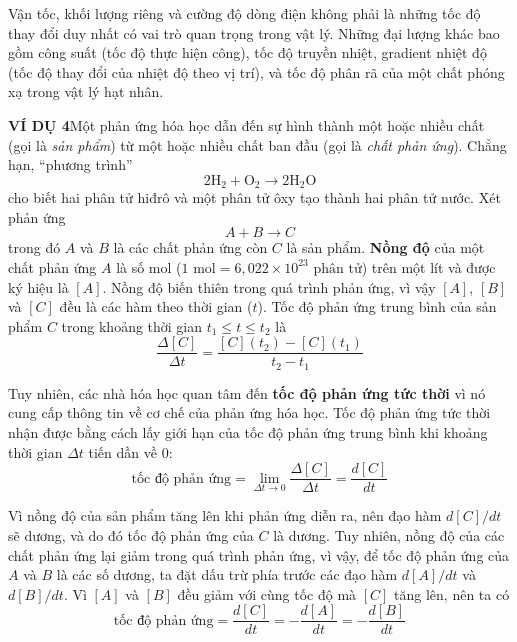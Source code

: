 \noindent
Vận tốc, khối lượng riêng và cường độ dòng điện không phải là những tốc độ thay đổi duy nhất có vai trò quan trọng trong vật lý. Những đại lượng khác bao gồm công suất (tốc độ thực hiện công), tốc độ truyền nhiệt, gradient nhiệt độ (tốc độ thay đổi của nhiệt độ theo vị trí), và tốc độ phân rã của một chất phóng xạ trong vật lý hạt nhân.

\vspace{1.2em}
\vspace{0.6em}

\noindent
\textcolor{stewartblue}{\textbf{\sffamily VÍ DỤ 4}}\hspace{1em}Một phản ứng hóa học dẫn đến sự hình thành một hoặc nhiều chất (gọi là \textit{sản phẩm}) từ một hoặc nhiều chất ban đầu (gọi là \textit{chất phản ứng}). Chẳng hạn, “phương trình”
\begin{equation*}
2\text{H}_2 + \text{O}_2 \to 2\text{H}_2\text{O}
\end{equation*}
\noindent
cho biết hai phân tử hiđrô và một phân tử ôxy tạo thành hai phân tử nước. Xét phản ứng
\begin{equation*}
A + B \to C
\end{equation*}
\noindent
trong đó $A$ và $B$ là các chất phản ứng còn $C$ là sản phẩm. \textbf{Nồng độ} của một chất phản ứng $A$ là số mol ($1\text{ mol} = 6{,}022 \times 10^{23}\text{ phân tử}$) trên một lít và được ký hiệu là $[A]$. Nồng độ biến thiên trong quá trình phản ứng, vì vậy $[A]$, $[B]$ và $[C]$ đều là các hàm theo thời gian ($t$). Tốc độ phản ứng trung bình của sản phẩm $C$ trong khoảng thời gian $t_1 \leqslant t \leqslant t_2$ là
\begin{equation*}
\frac{\Delta[C]}{\Delta t} = \frac{[C](t_2) - [C](t_1)}{t_2 - t_1}
\end{equation*}

Tuy nhiên, các nhà hóa học quan tâm đến \textbf{tốc độ phản ứng tức thời} vì nó cung cấp thông tin về cơ chế của phản ứng hóa học. Tốc độ phản ứng tức thời nhận được bằng cách lấy giới hạn của tốc độ phản ứng trung bình khi khoảng thời gian $\Delta t$ tiến dần về 0:
\begin{equation*}
\text{tốc độ phản ứng} = \lim_{\Delta t \to 0} \frac{\Delta[C]}{\Delta t} = \frac{d[C]}{dt}
\end{equation*}

Vì nồng độ của sản phẩm tăng lên khi phản ứng diễn ra, nên đạo hàm $d[C]/dt$ sẽ dương, và do đó tốc độ phản ứng của $C$ là dương. Tuy nhiên, nồng độ của các chất phản ứng lại giảm trong quá trình phản ứng, vì vậy, để tốc độ phản ứng của $A$ và $B$ là các số dương, ta đặt dấu trừ phía trước các đạo hàm $d[A]/dt$ và $d[B]/dt$. Vì $[A]$ và $[B]$ đều giảm với cùng tốc độ mà $[C]$ tăng lên, nên ta có
\begin{equation*}
\text{tốc độ phản ứng} = \frac{d[C]}{dt} = -\frac{d[A]}{dt} = -\frac{d[B]}{dt}
\end{equation*}

